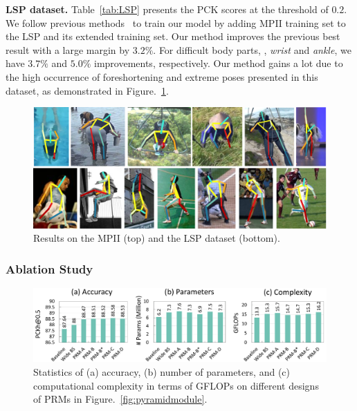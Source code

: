 \documentclass[10pt,twocolumn,letterpaper]{article}
\newcommand{\smalltitle}[1]{\vspace{0.2em}\noindent \textbf{{#1}}}
\begin{document}
\smalltitle{LSP dataset.}
Table~\ref{tab:LSP} presents the PCK scores at the threshold of $0.2$. We follow previous methods~\cite{pishchulin2016deepcut,wei2016convolutional,insafutdinov2016deepercut} to train our model by adding MPII training set to the LSP and its extended training set. 
Our method improves the previous best result with a large margin by $3.2\%$. 
For difficult body parts, \eg, \textit{wrist} and \textit{ankle}, we have $3.7\%$ and $5.0\%$ improvements, respectively. 
Our method gains a lot due to the high occurrence of foreshortening and extreme poses presented in this dataset, as demonstrated in Figure.~\ref{fig:qualitative_results}. 

\begin{figure}[t]
\begin{center}
   \includegraphics[width=1\linewidth]{figures/quality.pdf}
\end{center}
	\vspace{-1em}
   \caption{ Results on the MPII (top) and the LSP dataset (bottom).}
	\label{fig:qualitative_results}
	\vspace{-1em}
\end{figure}



\subsubsection{Ablation Study}\label{sec:ablation}
\begin{figure}[t]
\begin{center}
   \includegraphics[width=1\linewidth]{figures/ablation_arch3.pdf}
\end{center}
   \vspace{-1em}
   \caption{Statistics of (a) accuracy, (b) number of parameters, and (c) computational complexity in terms of GFLOPs on different designs of PRMs in Figure.~\ref{fig:pyramidmodule}.}
\label{fig:ablation_arch}
\vspace{-1em}
\end{figure}
\end{document}
